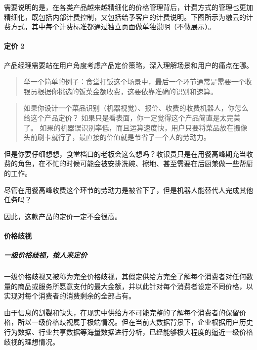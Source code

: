 \documentclass[letterpaper,11pt,english]{sphinxmanual}
\begin{document}
需要说明的是，在各类产品越来越精细化的价格管理背后，计费方式的管理也更加精细化，既包括内部计费控制，又包括给予客户的计费说明。下图所示为融云的计费方式，其中每个计费标准都通过独立页面做单独说明（不做展示）。


\paragraph{定价 2\sphinxfootnotemark[596]}
\label{\detokenize{chapter_knowledge/price:id3}}%
\begin{footnotetext}[596]\sphinxAtStartFootnote
{}
%
\end{footnotetext}\ignorespaces 
产品经理需要站在用户角度考虑产品定价策略，深入理解场景和用户的痛点在哪。
\begin{quote}

举一个简单的例子：食堂打饭这个场景中，最后一个环节通常是需要一个收银员根据你挑选的饭菜金额收费，这要依靠准确的识别和速算。
\end{quote}
\begin{quote}

如果你设计一个菜品识别（机器视觉）、报价、收费的收费机器人，你怎么给这个产品定价？
如果只是看表面，你一定觉得这个产品简直是太完美了。
如果的机器误识别率低，而且运算速度快，用户只要将菜品放在摄像头前刷卡就行了，最直接的价值就是节省了一个人的劳动力。
\end{quote}

但是你要仔细想想，食堂档口的老板会这么想吗？收银员只是在用餐高峰期充当收费的角色，在不忙的时候可能会被安排洗碗、擦地、甚至需要在后厨兼做一些帮厨的工作。

尽管在用餐高峰收费这个环节的劳动力是被省下了，但是机器人能替代人完成其他任务吗？

因此，这款产品的定价一定不会很高。


\paragraph{价格歧视}
\label{\detokenize{chapter_knowledge/price:id4}}

\subparagraph{一级价格歧视，按人来定价}
\label{\detokenize{chapter_knowledge/price:id5}}
一级价格歧视又被称为完全价格歧视，其假定供给方完全了解每个消费者对任何数量的商品或服务所愿意支付的最大金额，并以此针对每个消费者设定不同价格，以实现对每个消费者的消费剩余的全部占有。

由于信息的割裂和缺失，在现实中供给方不可能完整的了解每个消费者的保留价格，所以一级价格歧视属于极端情况。但在当前大数据背景下，企业根据用户历史行为数据、行业共享数据等海量数据进行分析，已经能够极大程度的逼近一级价格歧视的理想情况。
\end{document}

